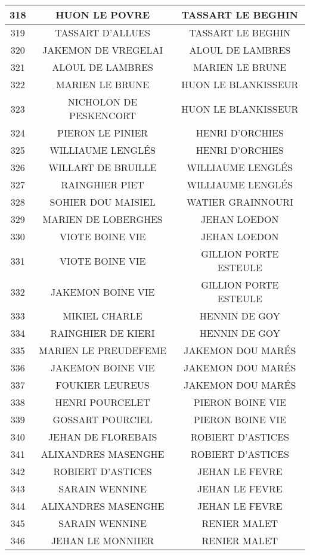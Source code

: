 \begin{center}
\begin{longtable}{|c|c|c|}
\hline	318	&	HUON LE POVRE	&	TASSART LE BEGHIN	\\
\hline	319	&	TASSART D'ALLUES	&	TASSART LE BEGHIN	\\
\hline	320	&	JAKEMON DE VREGELAI	&	ALOUL DE LAMBRES	\\
\hline	321	&	ALOUL DE LAMBRES	&	MARIEN LE BRUNE	\\
\hline	322	&	MARIEN LE BRUNE	&	HUON LE BLANKISSEUR	\\
\hline	323	&	NICHOLON DE PESKENCORT	&	HUON LE BLANKISSEUR	\\
\hline	324	&	PIERON LE PINIER	&	HENRI D'ORCHIES	\\
\hline	325	&	WILLIAUME LENGLÉS	&	HENRI D'ORCHIES	\\
\hline	326	&	WILLART DE BRUILLE	&	WILLIAUME LENGLÉS	\\
\hline	327	&	RAINGHIER PIET	&	WILLIAUME LENGLÉS	\\
\hline	328	&	SOHIER DOU MAISIEL	&	WATIER GRAINNOURI	\\
\hline	329	&	MARIEN DE LOBERGHES	&	JEHAN LOEDON	\\
\hline	330	&	VIOTE BOINE VIE	&	JEHAN LOEDON	\\
\hline	331	&	VIOTE BOINE VIE	&	GILLION PORTE ESTEULE	\\
\hline	332	&	JAKEMON BOINE VIE	&	GILLION PORTE ESTEULE	\\
\hline	333	&	MIKIEL CHARLE	&	HENNIN DE GOY	\\
\hline	334	&	RAINGHIER DE KIERI	&	HENNIN DE GOY	\\
\hline	335	&	MARIEN LE PREUDEFEME	&	JAKEMON DOU MARÉS	\\
\hline	336	&	JAKEMON BOINE VIE	&	JAKEMON DOU MARÉS	\\
\hline	337	&	FOUKIER LEUREUS	&	JAKEMON DOU MARÉS	\\
\hline	338	&	HENRI POURCELET	&	PIERON BOINE VIE	\\
\hline	339	&	GOSSART POURCIEL	&	PIERON BOINE VIE	\\
\hline	340	&	JEHAN DE FLOREBAIS	&	ROBIERT D'ASTICES	\\
\hline	341	&	ALIXANDRES MASENGHE	&	ROBIERT D'ASTICES	\\
\hline	342	&	ROBIERT D'ASTICES	&	JEHAN LE FEVRE	\\
\hline	343	&	SARAIN WENNINE	&	JEHAN LE FEVRE	\\
\hline	344	&	ALIXANDRES MASENGHE	&	JEHAN LE FEVRE	\\
\hline	345	&	SARAIN WENNINE	&	RENIER MALET	\\
\hline	346	&	JEHAN LE MONNIIER	&	RENIER MALET	\\

\end{longtable}
\end{center}
